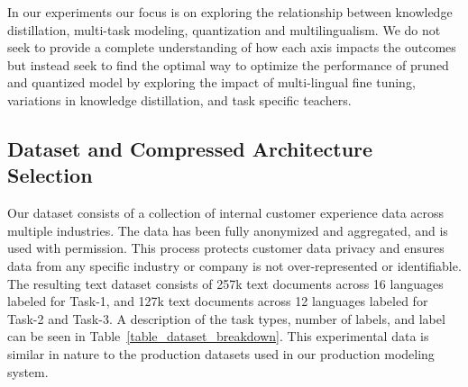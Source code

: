 In our experiments our focus is on exploring the relationship between knowledge distillation, multi-task modeling, quantization and multilingualism. 
We do not seek to provide a complete understanding of how each axis impacts the outcomes but instead seek to find the optimal way to optimize the performance of pruned and quantized model by exploring the impact of multi-lingual fine tuning, variations in knowledge distillation, and task specific teachers.

\subsection*{Dataset and Compressed Architecture Selection}
Our dataset consists of a collection of internal customer experience data across multiple industries.
The data has been fully anonymized and aggregated, and is used with permission.
This process protects customer data privacy and ensures data from any specific industry or company is not over-represented or identifiable.
The resulting text dataset consists of 257k text documents across 16 languages labeled for Task-1, and 127k text documents across 12 languages labeled for Task-2 and Task-3.
A description of the task types, number of labels, and label can be seen in Table~\ref{table_dataset_breakdown}.
This experimental data is similar in nature to the production datasets used in our production modeling system.

